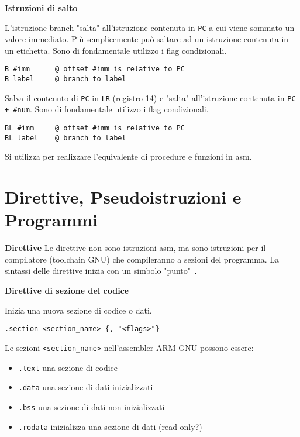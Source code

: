 \begin{defn}
\textbf{Istruzioni di salto}

L'istruzione branch "salta" all'istruzione contenuta in \verb|PC|  a cui viene sommato un valore immediato.
Più semplicemente può saltare ad un istruzione contenuta in un etichetta.
Sono di fondamentale utilizzo i flag condizionali.
\begin{lstlisting}[style=arm]
B #imm		@ offset #imm is relative to PC
B label		@ branch to label
\end{lstlisting}

Salva il contenuto di \verb|PC| in \verb|LR| (registro 14) e "salta" all'istruzione contenuta in \verb|PC + #num|. Sono di fondamentale utilizzo i flag condizionali.
\begin{lstlisting}[style=arm]
BL #imm		@ offset #imm is relative to PC
BL label	@ branch to label
\end{lstlisting}
Si utilizza per realizzare l'equivalente di procedure e funzioni in asm.
\end{defn}

\section{Direttive, Pseudoistruzioni e Programmi}

\begin{defn}
\textbf{Direttive}
Le direttive non sono istruzioni asm, ma sono istruzioni per il compilatore (toolchain GNU) che compileranno a sezioni del programma. La sintassi delle direttive inizia con un simbolo "punto" \verb|.|
\end{defn}

\begin{defn}
\textbf{Direttive di sezione del codice}

Inizia una nuova sezione di codice o dati.
\begin{lstlisting}[style=arm]
.section <section_name> {, "<flags>"}
\end{lstlisting}

Le sezioni \verb|<section_name>| nell'assembler ARM GNU possono essere:
\begin{itemize}
	\item \verb|.text| una sezione di codice
	\item \verb|.data| una sezione di dati inizializzati
	\item \verb|.bss| una sezione di dati non inizializzati
	\item \verb|.rodata| inizializza una sezione di dati (read only?)
\end{itemize}
\end{defn}

